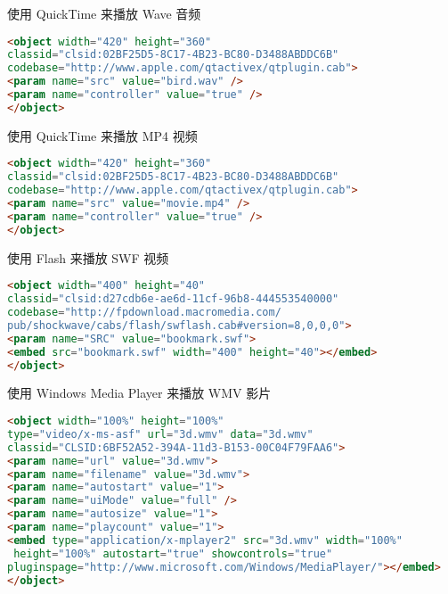 \begin{compactenum}
\item 使用 QuickTime 来播放 Wave 音频

\begin{lstlisting}[language=HTML]
<object width="420" height="360"
classid="clsid:02BF25D5-8C17-4B23-BC80-D3488ABDDC6B"
codebase="http://www.apple.com/qtactivex/qtplugin.cab">
<param name="src" value="bird.wav" />
<param name="controller" value="true" />
</object>
\end{lstlisting}


\item 使用 QuickTime 来播放 MP4 视频

\begin{lstlisting}[language=HTML]
<object width="420" height="360"
classid="clsid:02BF25D5-8C17-4B23-BC80-D3488ABDDC6B"
codebase="http://www.apple.com/qtactivex/qtplugin.cab">
<param name="src" value="movie.mp4" />
<param name="controller" value="true" />
</object>
\end{lstlisting}

\item 使用 Flash 来播放 SWF 视频

\begin{lstlisting}[language=HTML]
<object width="400" height="40"
classid="clsid:d27cdb6e-ae6d-11cf-96b8-444553540000"
codebase="http://fpdownload.macromedia.com/
pub/shockwave/cabs/flash/swflash.cab#version=8,0,0,0">
<param name="SRC" value="bookmark.swf">
<embed src="bookmark.swf" width="400" height="40"></embed>
</object>
\end{lstlisting}

\item 使用 Windows Media Player 来播放 WMV 影片

\begin{lstlisting}[language=HTML]
<object width="100%" height="100%"
type="video/x-ms-asf" url="3d.wmv" data="3d.wmv"
classid="CLSID:6BF52A52-394A-11d3-B153-00C04F79FAA6">
<param name="url" value="3d.wmv">
<param name="filename" value="3d.wmv">
<param name="autostart" value="1">
<param name="uiMode" value="full" />
<param name="autosize" value="1">
<param name="playcount" value="1">
<embed type="application/x-mplayer2" src="3d.wmv" width="100%"
 height="100%" autostart="true" showcontrols="true" 
pluginspage="http://www.microsoft.com/Windows/MediaPlayer/"></embed>
</object>
\end{lstlisting}

\end{compactenum}


